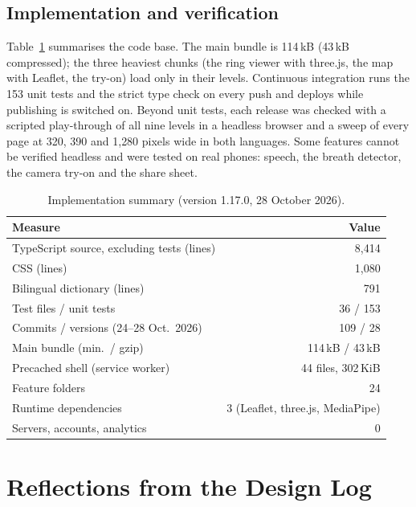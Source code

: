 \documentclass[sigconf,nonacm]{acmart}
\begin{document}
\subsection{Implementation and verification}
Table~\ref{tab:metrics} summarises the code base. The main bundle is 114\,kB (43\,kB compressed);
the three heaviest chunks (the ring viewer with three.js, the map with Leaflet, the try-on) load
only in their levels. Continuous integration runs the 153 unit tests and the strict type check on
every push and deploys while publishing is switched on. Beyond unit tests, each release was checked
with a scripted play-through of all nine levels in a headless browser and a sweep of every page at
320, 390 and 1{,}280 pixels wide in both languages. Some features cannot be verified headless and
were tested on real phones: speech, the breath detector, the camera try-on and the share sheet.

\begin{table}[t]
  \caption{Implementation summary (version 1.17.0, 28 October 2026).}
  \label{tab:metrics}
  \small
  \begin{tabular}{@{}lr@{}}
    \toprule
    Measure & Value \\
    \midrule
    TypeScript source, excluding tests (lines) & 8{,}414 \\
    CSS (lines) & 1{,}080 \\
    Bilingual dictionary (lines) & 791 \\
    Test files / unit tests & 36 / 153 \\
    Commits / versions (24--28 Oct.\ 2026) & 109 / 28 \\
    Main bundle (min.\ / gzip) & 114\,kB / 43\,kB \\
    Precached shell (service worker) & 44 files, 302\,KiB \\
    Feature folders & 24 \\
    Runtime dependencies & 3 (Leaflet, three.js, MediaPipe) \\
    Servers, accounts, analytics & 0 \\
    \bottomrule
  \end{tabular}
\end{table}

\section{Reflections from the Design Log}\label{sec:log}
\end{document}
